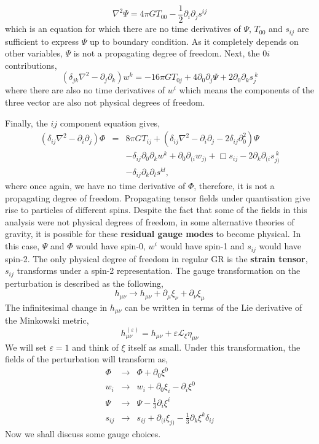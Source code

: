 \begin{equation}
    \nabla^2\Psi = 4\pi GT_{00} -\frac{1}{2}\partial_i\partial_js^{ij}
\end{equation}
which is an equation for which there are no time derivatives of $\Psi$, $T_{00}$ and $s_{ij}$ are sufficient to express $\Psi$ up to boundary condition. As it completely depends on other variables, $\Psi$ is not a propagating degree of freedom. Next, the $0i$ contributions,
\begin{equation}
    \left(\delta_{jk}\nabla^2 - \partial_j\partial_k \right)w^k = -16\pi GT_{0j} + 4\partial_0\partial_j\Psi + 2\partial_0\partial_ks_{j}^{\ k}
\end{equation}
where there are also no time derivatives of $w^i$ which means the components of the three vector are also not physical degrees of freedom. 

Finally, the $ij$ component equation gives, 
\begin{eqnarray}
    \left(\delta_{ij}\nabla^2 - \partial_i\partial_j \right)\Phi &=& 8\pi GT_{ij} + (\delta_{ij}\nabla^2 - \partial_i\partial_j - 2\delta_{ij}\partial_0^2)\Psi \nonumber\\
    &\ & - \delta_{ij}\partial_0\partial_kw^k + \partial_0\partial_{(i}w_{j)} + \Box s_{ij} - 2\partial_k\partial_{(i}s_{j)}^{\ k}\nonumber\\
    &\ & - \delta_{ij}\partial_k\partial_l s^{kl},
\end{eqnarray}
where once again, we have no time derivative of $\Phi$, therefore, it is not a propagating degree of freedom. Propagating tensor fields under quantisation give rise to particles of different spins. Despite the fact that some of the fields in this analysis were not physical degrees of freedom, in some alternative theories of gravity, it is possible for these \textbf{residual gauge modes} to become physical. In this case, $\Psi$ and $\Phi$ would have spin-0, $w^i$ would have spin-1 and $s_{ij}$ would have spin-2. The only physical degree of freedom in regular GR is the \textbf{strain tensor}, $s_{ij}$ transforms under a spin-2 representation.
The gauge transformation on the perturbation is described as the following, 
$$h_{\mu\nu}\rightarrow h_{\mu\nu} + \partial_{\mu}\xi_{\nu} + \partial_{\nu}\xi_{\mu}$$
The infinitesimal change in $h_{\mu\nu}$ can be written in terms of the Lie derivative of the Minkowski metric, 
\begin{equation}
    h_{\mu\nu}^{(\varepsilon)} = h_{\mu\nu} + \varepsilon\mathcal{L}_{\xi}\eta_{\mu\nu}
\end{equation}
We will set $\varepsilon=1$ and think of $\xi$ itself as small. Under this transformation, the fields of the perturbation will transform as, 
\begin{eqnarray}
    \Phi &\rightarrow& \Phi + \partial_0\xi^0\\
    w_i &\rightarrow& w_i + \partial_0\xi_i - \partial_{i}\xi^0\label{w-trans}\\
    \Psi &\rightarrow& \Psi - \frac{1}{3}\partial_i\xi^i\\
    s_{ij}&\rightarrow& s_{ij} + \partial_{(i}\xi_{j)} - \frac{1}{3}\partial_k\xi^k \delta_{ij}\label{s-trans}
\end{eqnarray}
Now we shall discuss some gauge choices.
